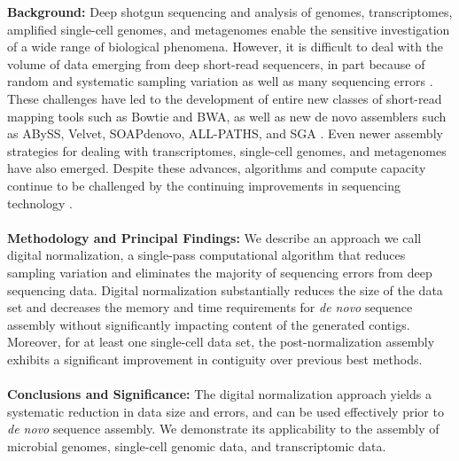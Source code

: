 \documentclass[10pt,draft]{article}
\begin{document}
{\bf Background:} Deep shotgun sequencing and analysis of genomes,
transcriptomes, amplified single-cell genomes, and metagenomes enable
the sensitive investigation of a wide range of biological
phenomena. However, it is difficult to deal with the volume of data
emerging from deep short-read sequencers, in part because of random
and systematic sampling variation as well as many sequencing errors
\cite{pubmed19482960,pubmed20211242}.
These challenges have led to the development of entire new classes of
short-read mapping tools such as Bowtie and BWA, as well as new de
novo assemblers such as ABySS, Velvet, SOAPdenovo, ALL-PATHS, and SGA
\cite{pubmed22068540,pubmed20211242,pubmed22156294}.
Even newer assembly strategies for dealing with transcriptomes,
single-cell genomes, and metagenomes have also emerged\cite{pubmed21572440,pubmed21926975,pubmed21685107}.  Despite these
advances, algorithms and compute capacity continue to be challenged by
the continuing improvements in sequencing technology \cite{pubmed22147368,
pubmed20835789}.
\\
\\
{\bf Methodology and Principal Findings:} We describe an approach we call
digital normalization, a single-pass computational algorithm that
reduces sampling variation and eliminates the majority of sequencing
errors from deep sequencing data. Digital normalization substantially
reduces the size of the data set and decreases the memory and time
requirements for {\em de novo} sequence assembly without significantly
impacting content of the generated contigs.  Moreover, for at least
one single-cell data set, the post-normalization assembly exhibits a significant improvement in contiguity over previous best methods.
\\
\\
{\bf Conclusions and Significance:} The digital normalization approach
yields a systematic reduction in data size and errors, and can be used
effectively prior to {\em de novo} sequence assembly.  We demonstrate its
applicability to the assembly of microbial genomes, single-cell
genomic data, and transcriptomic data.

%
\end{document}
